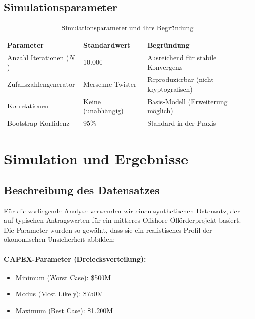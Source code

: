 \documentclass[11pt,a4paper]{article}
\begin{document}
\subsection{Simulationsparameter}

\begin{table}[H]
\centering
\begin{tabular}{lll}
\toprule
\textbf{Parameter} & \textbf{Standardwert} & \textbf{Begründung} \\
\midrule
Anzahl Iterationen ($N$) & 10.000 & Ausreichend für stabile Konvergenz \\
Zufallszahlengenerator & Mersenne Twister & Reproduzierbar (nicht kryptografisch) \\
Korrelationen & Keine (unabhängig) & Basis-Modell (Erweiterung möglich) \\
Bootstrap-Konfidenz & 95\% & Standard in der Praxis \\
\bottomrule
\end{tabular}
\caption{Simulationsparameter und ihre Begründung}
\end{table}

\section{Simulation und Ergebnisse}

\subsection{Beschreibung des Datensatzes}

Für die vorliegende Analyse verwenden wir einen synthetischen Datensatz, der auf typischen Antragswerten für ein mittleres Offshore-Ölförderprojekt basiert. Die Parameter wurden so gewählt, dass sie ein realistisches Profil der ökonomischen Unsicherheit abbilden:

\paragraph{CAPEX-Parameter (Dreiecksverteilung):}
\begin{itemize}[itemsep=1pt]
  \item Minimum (Worst Case): \$500M
  \item Modus (Most Likely): \$750M
  \item Maximum (Best Case): \$1.200M
\end{itemize}
\end{document}
